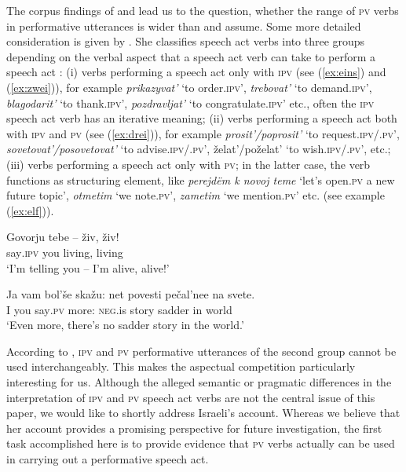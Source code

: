 \documentclass[output=paper,
colorlinks,
citecolor=brown,
newtxmath,
hidelinks
]{langscibook}
\begin{document}
\noindent The corpus findings of \citeauthor{Wiemer2014} and \citeauthor{Laczinski2014} lead us to the question, whether the range of \textsc{pv} verbs in performative utterances is wider than \citeauthor{Rjabceva1992} and \citeauthor{Dickey2000} assume. Some more detailed consideration is given by \citet{Israeli1996,Israeli2001}. She classifies speech act verbs into three groups depending on the verbal aspect that a speech act verb can take to perform a speech act \citep[84]{Israeli2001}: (i) verbs performing a speech act only with \textsc{ipv} (see (\ref{ex:eins}) and (\ref{ex:zwei})), for example \textit{prikazyvat’} ‘to order\textsc{.ipv}’, \textit{trebovat’} ‘to demand\textsc{.ipv}’, \textit{blagodarit’} ‘to thank\textsc{.ipv}’, \textit{pozdravljat’} ‘to congratulate\textsc{.ipv}’ etc., often the \textsc{ipv} speech act verb has an iterative meaning; (ii) verbs performing a speech act both with \textsc{ipv} and \textsc{pv} (see (\ref{ex:drei})), for example \textit {prosit’/poprosit’} ‘to request\textsc{.ipv}/\textsc{.pv}’, \textit{sovetovat’/posovetovat’} ‘to advise\textsc{.ipv}/\textsc{.pv}’, želat’/poželat’ ‘to wish\textsc{.ipv}/\textsc{.pv}’, etc.; (iii) verbs performing a speech act only with \textsc{pv}; in the latter case, the verb functions as structuring element, like \textit{perejdëm k novoj teme} ‘let’s open\textsc{.pv} a new future topic’, \textit{otmetim} ‘we note\textsc{.pv}’, \textit{zametim} ‘we mention\textsc{.pv}’ etc. (see example (\ref{ex:elf})). 

\ea\label{ex:zehn}
\gll  Govorju tebe -- živ, živ!\\
         say\textsc{.ipv} you {} living, living\\
\glt ‘I'm telling you -- I'm alive, alive!’
\z

\ea\label{ex:elf}
\gll Ja vam bol’še skažu: net povesti pečal’nee na svete.\\
            I   you   say\textsc{.pv}  more: \textsc{neg.}is story sadder in world\\
\glt ‘Even more, there's no sadder story in the world.’
\z

\noindent According to \citet{Israeli2001}, \textsc{ipv} and \textsc{pv} performative utterances of the second group cannot be used interchangeably. This makes the aspectual competition particularly interesting for us. Although the alleged semantic or pragmatic differences in the interpretation of \textsc{ipv} and \textsc{pv} speech act verbs are not the central issue of this paper, we would like to shortly address Israeli’s account. Whereas we believe that her account  provides a promising perspective for future investigation, the first task accomplished here is to provide evidence that \textsc{pv} verbs actually can be used in carrying out a performative speech act.\largerpage[2]
\end{document}
